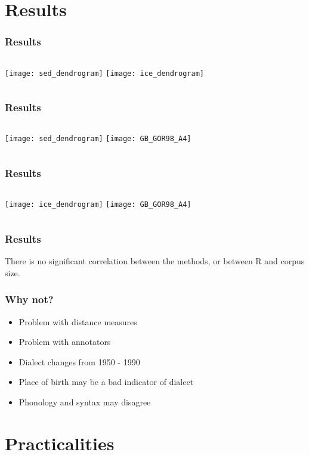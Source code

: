 \documentclass{beamer}
\begin{document}
\section{Results}
\begin{frame}
  \frametitle{Results}
  \begin{columns}
  \texttt{[image: sed\_dendrogram]}
  \texttt{[image: ice\_dendrogram]}
\end{columns}
\end{frame}
\begin{frame}
  \frametitle{Results}
  \begin{columns}
  \texttt{[image: sed\_dendrogram]}
  \texttt{[image: GB\_GOR98\_A4]}
\end{columns}
\end{frame}
\begin{frame}
  \frametitle{Results}
  \begin{columns}
  \texttt{[image: ice\_dendrogram]}
  \texttt{[image: GB\_GOR98\_A4]}
\end{columns}
\end{frame}
\begin{frame}
  \frametitle{Results}
  There is no significant correlation between the methods, or between
  R and corpus size.
\end{frame}
\begin{frame}
  \frametitle{Why not?}
  \begin{itemize}
  \item Problem with distance measures
  \item Problem with annotators
  \item Dialect changes from 1950 - 1990
  \item Place of birth may be a bad indicator of dialect
  \item Phonology and syntax may disagree
  \end{itemize}
\end{frame}
\section{Practicalities}
\end{document}
